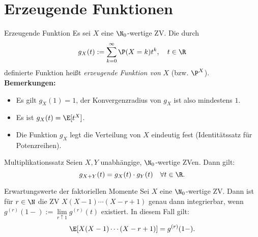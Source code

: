 \section*{Erzeugende Funktionen}

\begin{karte}{Erzeugende Funktion}
	Es sei $X$ eine $\N_0$-wertige ZV. Die durch 
	$$ g_X(t):= \sum_{k=0}^{\infty} \P(X=k) t^k, \quad t \in \R$$
	definierte Funktion heißt \textit{erzeugende Funktion von} $X$ (bzw. $\P^X$). \\
	\textbf{Bemerkungen:}
	\begin{itemize}
		\item Es gilt $g_X(1)=1$, der Konvergenzradius von $g_X$ ist also mindestens $1$.
		\item Es ist $g_X(t)=\E[t^X]$.
		\item Die Funktion $g_X$ legt die Verteilung von $X$ eindeutig fest (Identitätssatz für Potenzreihen).
	\end{itemize}
\end{karte}

\begin{karte}{Multiplikationssatz}
	Seien $X,Y$ unabhängige, $\N_0$-wertige ZVen. Dann gilt:
	$$ g_{X+Y}(t) = g_X(t) \cdot g_Y(t) \quad \forall t \in \R.$$
\end{karte}

\begin{karte}{Erwartungswerte der faktoriellen Momente}
	Sei $X$ eine $\N_0$-wertige ZV. Dann ist für $r\in \N$ die ZV $X(X-1)\cdots(X-r+1)$ genau dann integrierbar, 
	wenn $g^{(r)}(1-):= \lim\limits_{r \uparrow 1} g^{(r)}(t)$ existiert. In diesem Fall gilt:
	$$ \E[X(X-1)\cdots(X-r+1)]=g^{(r)}(1-).$$
\end{karte}